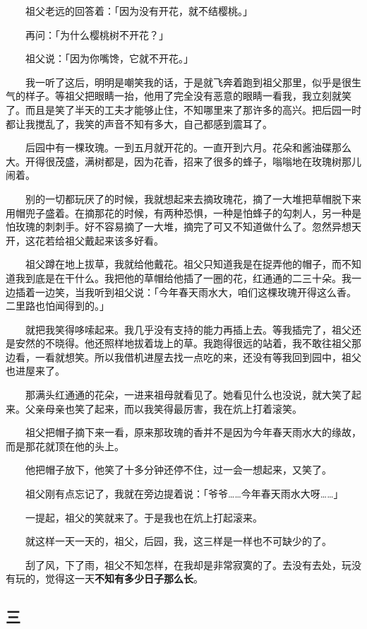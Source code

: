 \documentclass[UTF8]{ctexart}
\begin{document}
　　祖父老远的回答着：「因为没有开花，就不结樱桃。」

　　再问：「为什么樱桃树不开花？」

　　祖父说：「因为你嘴馋，它就不开花。」

　　我一听了这后，明明是嘲笑我的话，于是就飞奔着跑到祖父那里，似乎是很生气的样子。等祖父把眼睛一抬，他用了完全没有恶意的眼睛一看我，我立刻就笑了。而且是笑了半天的工夫才能够止住，不知哪里来了那许多的高兴。把后园一时都让我搅乱了，我笑的声音不知有多大，自己都感到震耳了。

　　后园中有一棵玫瑰。一到五月就开花的。一直开到六月。花朵和酱油碟那么大。开得很茂盛，满树都是，因为花香，招来了很多的蜂子，嗡嗡地在玫瑰树那儿闹着。

　　别的一切都玩厌了的时候，我就想起来去摘玫瑰花，摘了一大堆把草帽脱下来用帽兜子盛着。在摘那花的时候，有两种恐惧，一种是怕蜂子的勾刺人，另一种是怕玫瑰的刺刺手。好不容易摘了一大堆，摘完了可又不知道做什么了。忽然异想天开，这花若给祖父戴起来该多好看。

　　祖父蹲在地上拔草，我就给他戴花。祖父只知道我是在捉弄他的帽子，而不知道我到底是在干什么。我把他的草帽给他插了一圈的花，红通通的二三十朵。我一边插着一边笑，当我听到祖父说：「今年春天雨水大，咱们这棵玫瑰开得这么香。二里路也怕闻得到的。」

　　就把我笑得哆嗦起来。我几乎没有支持的能力再插上去。等我插完了，祖父还是安然的不晓得。他还照样地拔着垅上的草。我跑得很远的站着，我不敢往祖父那边看，一看就想笑。所以我借机进屋去找一点吃的来，还没有等我回到园中，祖父也进屋来了。

　　那满头红通通的花朵，一进来祖母就看见了。她看见什么也没说，就大笑了起来。父亲母亲也笑了起来，而以我笑得最厉害，我在炕上打着滚笑。

　　祖父把帽子摘下来一看，原来那玫瑰的香并不是因为今年春天雨水大的缘故，而是那花就顶在他的头上。

　　他把帽子放下，他笑了十多分钟还停不住，过一会一想起来，又笑了。

　　祖父刚有点忘记了，我就在旁边提着说：「爷爷……今年春天雨水大呀……」

　　一提起，祖父的笑就来了。于是我也在炕上打起滚来。

　　就这样一天一天的，祖父，后园，我，这三样是一样也不可缺少的了。

　　刮了风，下了雨，祖父不知怎样，在我却是非常寂寞的了。去没有去处，玩没有玩的，觉得这一天\textbf{不知有多少日子那么长}。

\subsection{三}
\end{document}
